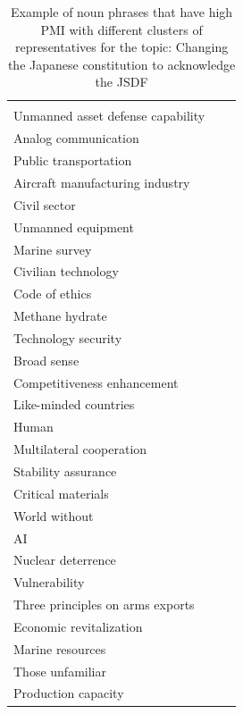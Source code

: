 \documentclass[final,5p,times,twocolumn,authoryear]{elsarticle}
\begin{document}
\begin{table}[htbp]
\begin{tabularx}{\textwidth}{|>{\centering\arraybackslash}X|>{\centering\arraybackslash}X|>{\centering\arraybackslash}X|}
\begin{tabular}[c]{@{}l@{}}
	United Kingdom \\ Unmanned asset defense capability \\ Analog communication \\ Public transportation \\ Aircraft manufacturing industry \\ Civil sector \\ Unmanned equipment \\ Marine survey \\ Civilian technology \\ Code of ethics \\ Methane hydrate \\ Technology security \\ Broad sense \\ Competitiveness enhancement \\ Like-minded countries \\ Human \\ Multilateral cooperation \\ Stability assurance \\ Critical materials \\ World without \\ AI \\ Nuclear deterrence \\ Vulnerability \\ Three principles on arms exports \\ Economic revitalization \\ Marine resources \\ Those unfamiliar \\ Production capacity
\end{tabular} \\ \hline
\end{tabularx}
\caption{Example of noun phrases that have high PMI with different clusters of representatives for the topic: Changing the Japanese constitution to acknowledge the JSDF}
\label{table:PMI-constitution}
\end{table}
\end{document}

